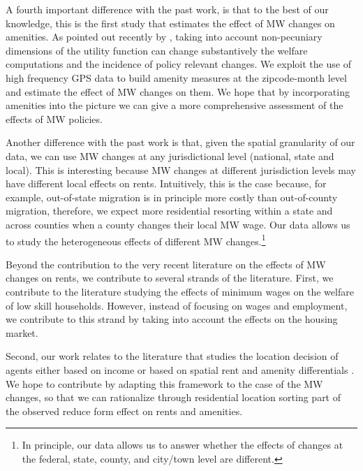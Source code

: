 A fourth important difference with the past work, is that to the best of our knowledge, this is the first study that estimates the effect of MW changes on amenities. As pointed out recently by \textcite{diamond2016determinants, almagro2019location}, taking into account non-pecuniary dimensions of the utility function can change substantively the welfare computations and the incidence of policy relevant changes. We exploit the use of high frequency GPS data to build amenity measures at the zipcode-month level and estimate the effect of MW changes on them. We hope that by incorporating amenities into the picture we can give a more comprehensive assessment of the effects of MW policies.

Another difference with the past work is that, given the spatial granularity of our data, we can use MW changes at any jurisdictional level (national, state and local). This is interesting because MW changes at different jurisdiction levels may have different local effects on rents. Intuitively, this is the case because, for example, out-of-state migration is in principle more costly than out-of-county migration, therefore, we expect more residential resorting within a state and across counties when a county changes their local MW wage. Our data allows us to study the heterogeneous effects of different MW changes.\footnote{In principle, our data allows us to answer whether the effects of changes at the federal, state, county, and city/town level are different.} 

Beyond the contribution to the very recent literature on the effects of MW changes on rents, we contribute to several strands of the literature. First, we contribute to the literature studying the effects of minimum wages on the welfare of low skill households. However, instead of focusing on wages and employment\parencite{dinardo1995labor, autor2016contribution, card2000minimum, neumark2006minimum, jardim2017minimum}, we contribute to this strand by taking into account the effects on the housing market.

Second, our work relates to the literature that studies the location decision of agents either based on income \parencite{roback1982wages, kennan2011effect, desmet2013urban, perez2018city} or based on spatial rent and amenity differentials \parencite{diamond2016determinants,almagro2019location,couture2019income, bayer2004equilibrium}. We hope to contribute by adapting this framework to the case of the MW changes, so that we can rationalize through residential location sorting part of the observed reduce form effect on rents and amenities. 

